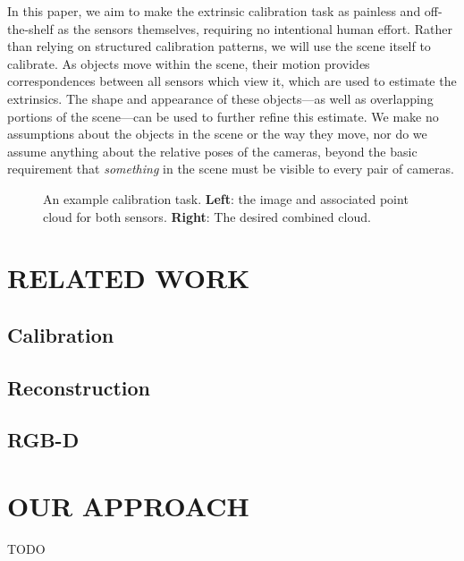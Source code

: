 \documentclass[letterpaper, 10 pt, conference]{ieeeconf}  %
\begin{document}
In this paper, we aim to make the extrinsic calibration task as painless and off-the-shelf as the sensors themselves, 
requiring no intentional human effort. Rather than relying on structured calibration patterns, 
we will use the scene itself to calibrate. As objects move within the scene, their motion provides
correspondences between all sensors which view it, which are used to estimate the extrinsics. 
The shape and appearance of these objects---as well as overlapping portions of the scene---can be used to further 
refine this estimate. We make no assumptions about the objects in the scene or the way they move, nor do we assume anything 
about the relative poses of the cameras, beyond the basic requirement that \emph{something} in the scene must be visible to every pair of cameras.


\begin{figure*}
  \centering
  \caption{An example calibration task. \textbf{Left}: the image and associated point cloud for both sensors. \textbf{Right}: The desired combined cloud.}
  \label{fig:example_alignment}
\end{figure*}

\section{RELATED WORK}
\cite{rubleeorb}
\subsection{Calibration}

\subsection{Reconstruction}

\subsection{RGB-D}


\section{OUR APPROACH}
TODO

\end{document}
